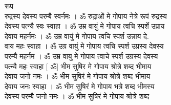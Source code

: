 \documentclass[11pt, openany]{book}
\begin{document}
{{{{{{{{{{{{{{{{{{{{{{{{{{{{{{{{{{{{{{{{{{{{{{{{{{{{{{{{{{{{{{{{{{{{{{{{{{{{{{{{{{{{{{{{{{{{{{{{{{{{{{{{{{{{{{{{{{{{{{{{{{{{{{{{{{{{{{{{{{{{{{{{{{{{{{{{{रूप\\
रुद्रस्य देवस्य परम्बै स्वर्नमः । ॐ रुद्राओं मे गोपाय नेत्रे रूपं
रुद्रस्य\\
देवस्य पत्न्यै स्वः स्वाहा । ॐ उम्र वायुं मे गोपाय त्वचि स्पर्शे
उप्राय\\
देवाय महर्नमः । ॐ उम्र वायुं मे गोपाय त्वचि स्पर्श उन्नाय दे.\\
वाय महः स्वाहा । ॐ उग्र वायुं मे गोपाय त्वचि स्पर्श उप्रस्य देवस्य\\
परम्यै महर्नम । ॐ उम्र वायु मे गोपाय त्वाचे स्पर्श उग्रस्य देवस्य\\
पत्न्यै महः स्वाहा \textbar{} {[} ॐ{]} भीम सुषिर मे गोपाय श्रोत्रे शब्द
भीमाय\\
देवाय जनो नमः । ॐ भीम सुषिरं मे गोपाय श्रोत्रे शब्द भीमाय\\
देवाय जनः स्वाहा । ॐ भीम सुषिरं मे गोपाय भत्रे शब्द भीमस्य\\
देवस्य परम्बै जनो नमः । ॐ भीम सुषिरं मे गोपाय श्रोत्रे शब्द\\


}}}}}}}}}}}}}}}}}}}}}}}}}}}}}}}}}}}}}}}}}}}}}}}}}}}}}}}}}}}}}}}}}}}}}}}}}}}}}}}}}}}}}}}}}}}}}}}}}}}}}}}}}}}}}}}}}}}}}}}}}}}}}}}}}}}}}}}}}}}}}}}}}}}}}}}}}
\end{document}
